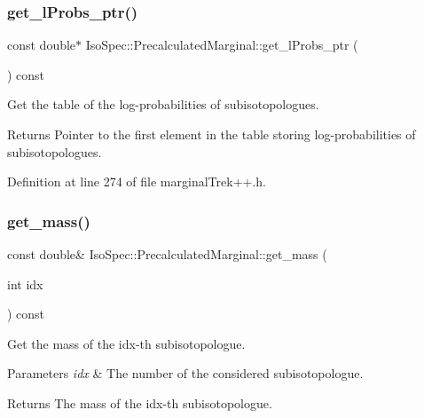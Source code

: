 \subsubsection{\texorpdfstring{get\+\_\+l\+Probs\+\_\+ptr()}{get\_lProbs\_ptr()}}
{\footnotesize\ttfamily const double$\ast$ Iso\+Spec\+::\+Precalculated\+Marginal\+::get\+\_\+l\+Probs\+\_\+ptr (\begin{DoxyParamCaption}{ }\end{DoxyParamCaption}) const\hspace{0.3cm}{\ttfamily [inline]}}



Get the table of the log-\/probabilities of subisotopologues. 

\begin{DoxyReturn}{Returns}
Pointer to the first element in the table storing log-\/probabilities of subisotopologues. 
\end{DoxyReturn}


Definition at line 274 of file marginal\+Trek++.\+h.

\mbox{\label{class_iso_spec_1_1_precalculated_marginal_ada12caa2e195c1a16c5158a428ea3ed2}} 
\subsubsection{\texorpdfstring{get\+\_\+mass()}{get\_mass()}}
{\footnotesize\ttfamily const double\& Iso\+Spec\+::\+Precalculated\+Marginal\+::get\+\_\+mass (\begin{DoxyParamCaption}\item[{int}]{idx }\end{DoxyParamCaption}) const\hspace{0.3cm}{\ttfamily [inline]}}



Get the mass of the idx-\/th subisotopologue. 


\begin{DoxyParams}{Parameters}
{\em idx} & The number of the considered subisotopologue. \\
\hline
\end{DoxyParams}
\begin{DoxyReturn}{Returns}
The mass of the idx-\/th subisotopologue. 
\end{DoxyReturn}


